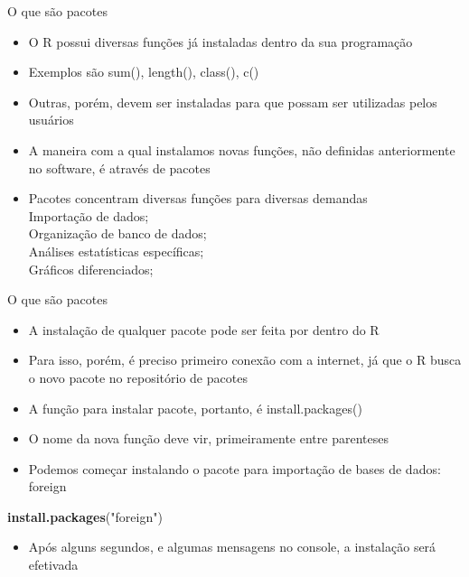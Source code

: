 \documentclass[
  10pt,
  ignorenonframetext,
]{beamer}
\newenvironment{Shaded}{\begin{snugshade}}{\end{snugshade}}
\newcommand{\KeywordTok}[1]{\textcolor[rgb]{0.13,0.29,0.53}{\textbf{#1}}}
\newcommand{\NormalTok}[1]{#1}
\newcommand{\StringTok}[1]{\textcolor[rgb]{0.31,0.60,0.02}{#1}}
\providecommand{\tightlist}{%
  \setlength{\itemsep}{0pt}\setlength{\parskip}{0pt}}
\begin{document}
\begin{frame}{O que são pacotes}
\protect\hypertarget{o-que-suxe3o-pacotes}{}
\begin{itemize}
\tightlist
\item
  O R possui diversas funções já instaladas dentro da sua programação
\item
  Exemplos são sum(), length(), class(), c()
\item
  Outras, porém, devem ser instaladas para que possam ser utilizadas
  pelos usuários
\item
  A maneira com a qual instalamos novas funções, não definidas
  anteriormente no software, é através de pacotes
\item
  Pacotes concentram diversas funções para diversas demandas\\
  Importação de dados;\\
  Organização de banco de dados;\\
  Análises estatísticas específicas;\\
  Gráficos diferenciados;
\end{itemize}
\end{frame}

\begin{frame}[fragile]{O que são pacotes}
\protect\hypertarget{o-que-suxe3o-pacotes-1}{}
\begin{itemize}
\tightlist
\item
  A instalação de qualquer pacote pode ser feita por dentro do R
\item
  Para isso, porém, é preciso primeiro conexão com a internet, já que o
  R busca o novo pacote no repositório de pacotes
\item
  A função para instalar pacote, portanto, é install.packages()
\item
  O nome da nova função deve vir, primeiramente entre parenteses
\item
  Podemos começar instalando o pacote para importação de bases de dados:
  foreign
\end{itemize}

\begin{Shaded}
\begin{Highlighting}[]
\KeywordTok{install.packages}\NormalTok{(}\StringTok{"foreign"}\NormalTok{)}
\end{Highlighting}
\end{Shaded}

\begin{itemize}
\tightlist
\item
  Após alguns segundos, e algumas mensagens no console, a instalação
  será efetivada
\end{itemize}
\end{frame}
\end{document}

